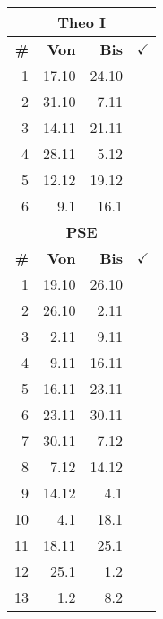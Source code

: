 \documentclass{article}
\begin{document}
\begin{table}
    \begin{tabular}{r|r|r|l}
        \multicolumn{4}{c}{\textbf{Theo I}}\\
        \hline
        \hline
        \textbf{\#}&
        \textbf{Von}&
        \textbf{Bis}&
        $\checkmark$\\
        \hline
        \hline
        1&17.10&24.10&\\
        2&31.10&7.11&\\
        3&14.11&21.11&\\
        4&28.11&5.12&\\
        5&12.12&19.12&\\
        6&9.1&16.1&\\
        \hline
        \hline

        \multicolumn{4}{c}{\textbf{PSE}}\\
        \hline
        \hline
        \textbf{\#}&
        \textbf{Von}&
        \textbf{Bis}&
        $\checkmark$\\
        \hline
        \hline
        1&19.10&26.10\\
        2&26.10&2.11\\
        3&2.11&9.11\\
        4&9.11&16.11\\
        5&16.11&23.11\\
        6&23.11&30.11\\
        7&30.11&7.12\\
        8&7.12&14.12\\
        9&14.12&4.1\\
        10&4.1&18.1\\
        11&18.11&25.1\\
        12&25.1&1.2\\
        13&1.2&8.2\\
        \hline
        \hline


\end{tabular}
\end{table}
\end{document}
